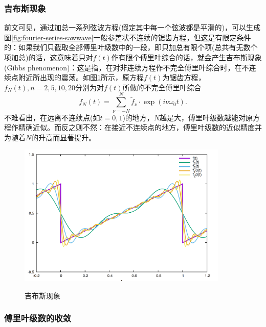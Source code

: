 \subsubsection{吉布斯现象}
\label{sec:fourier-series-gibbs-phenomenon}
前文可见，通过加总一系列弦波方程(假定其中每一个弦波都是平滑的)，可以生成图\ref{fig:fourier-series-sawwave}一般参差状不连续的锯齿方程，但这是有限定条件的：如果我们只截取全部傅里叶级数中的一段，即只加总有限个项(总共有无数个项加总)的话，这意味着只对$f(t)$作有限个傅里叶综合的话，就会产生吉布斯现象(Gibbs phenomenon)：这是指，在对非连续方程作不完全傅里叶综合时，在不连续点附近所出现的震荡。如图\ref{fig:fourier-series-gibbs-phenomenon}所示，原方程$f(t)$为锯齿方程，$f_{N}(t), n=2,5,10,20$分别为对$f(t)$所做的不完全傅里叶综合
\begin{equation*}
  f_{N}(t) = \sum_{\nu = - N}^{N} \tilde{f}_{\nu} \cdot \exp \left( i \nu \omega_{0} t \right).
\end{equation*}
不难看出，在远离不连续点(如$t=0,1$)的地方，$N$越是大，傅里叶级数越能对原方程作精确近似。而反之则不然：在接近不连续点的地方，傅里叶级数的近似精度并为随着$N$的升高而显著提升。

\begin{figure}[htbp]
   \caption{吉布斯现象}
  \centering
  \includegraphics[width=10cm]{./Figures/20180305-gibbs-phenomenon.png}
  \label{fig:fourier-series-gibbs-phenomenon}
%
\end{figure}

\subsubsection{傅里叶级数的收敛}
\label{sec:fourier-series-convergence}

